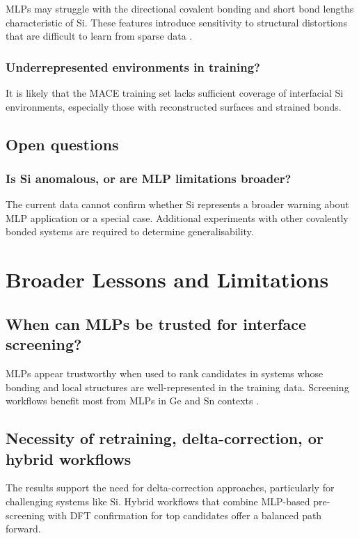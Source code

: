 MLPs may struggle with the directional covalent bonding and short bond lengths characteristic of Si. These features introduce sensitivity to structural distortions that are difficult to learn from sparse data .

\subsubsection{Underrepresented environments in training?}

It is likely that the MACE training set lacks sufficient coverage of interfacial Si environments, especially those with reconstructed surfaces and strained bonds. 

\subsection{Open questions}

\subsubsection{Is Si anomalous, or are MLP limitations broader?}

The current data cannot confirm whether Si represents a broader warning about MLP application or a special case. Additional experiments with other covalently bonded systems are required to determine generalisability.

\section{Broader Lessons and Limitations} \label{section:broader_lessons_and_limitations}

\subsection{When can MLPs be trusted for interface screening?}

MLPs appear trustworthy when used to rank candidates in systems whose bonding and local structures are well-represented in the training data. Screening workflows benefit most from MLPs in Ge and Sn contexts .

\subsection{Necessity of retraining, delta-correction, or hybrid workflows}

The results support the need for delta-correction approaches, particularly for challenging systems like Si. Hybrid workflows that combine MLP-based pre-screening with DFT confirmation for top candidates offer a balanced path forward. 

